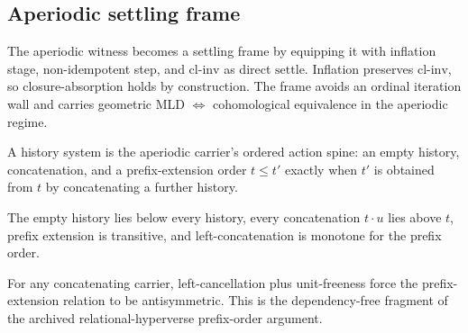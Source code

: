 \subsection{Aperiodic settling frame}

\begin{theorem}\label{thm:aperiodic-settle-frame}\leanok{}
The aperiodic witness becomes a settling frame by equipping it with inflation
stage, non-idempotent step, and \(\mathrm{cl\text{-}inv}\) as direct
\(\mathrm{settle}\).  Inflation preserves \(\mathrm{cl\text{-}inv}\), so
closure-absorption holds by construction.  The frame avoids an ordinal iteration
wall and carries geometric MLD \(\iff\) cohomological equivalence in the
aperiodic regime.
\end{theorem}

\begin{proposition}\label{thm:aperiodic-history-system}\leanok{}
A history system is the aperiodic carrier's ordered action spine: an empty
history, concatenation, and a prefix-extension order \(t \leq t'\) exactly when
\(t'\) is obtained from \(t\) by concatenating a further history.
\end{proposition}

\begin{theorem}\label{thm:aperiodic-history-prefix-laws}\leanok{}
The empty history lies below every history, every concatenation \(t\cdot u\)
lies above \(t\), prefix extension is transitive, and left-concatenation is
monotone for the prefix order.
\end{theorem}

\begin{theorem}\label{thm:prefix-antisymm-cancel-unitfree}\leanok{}
For any concatenating carrier, left-cancellation plus unit-freeness force the
prefix-extension relation to be antisymmetric. This is the dependency-free
fragment of the archived relational-hyperverse prefix-order argument.
\end{theorem}

